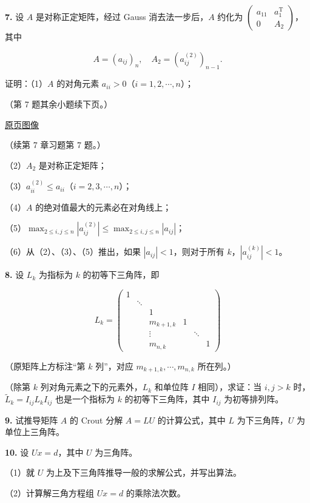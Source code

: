 \documentclass[
  10pt,
  fontset=fandol]{ctexart}
\begin{document}
\textbf{7.} 设 \(A\) 是对称正定矩阵，经过 Gauss 消去法一步后，\(A\) 约化为 \(\begin{pmatrix}a_{11}&a_1^{\mathrm T}\\0&A_2\end{pmatrix}\)，其中

\[
A=(a_{ij})_n,\quad A_2=(a_{ij}^{(2)})_{n-1}.
\]

证明：（1）\(A\) 的对角元素 \(a_{ii}>0\)（\(i=1,2,\cdots,n\)）；

（第 7 题其余小题续下页。）

\href{../../source-images/pdf-213.jpeg}{原页图像}

（续第 7 章习题第 7 题。）

（2）\(A_2\) 是对称正定矩阵；

（3）\(a_{ii}^{(2)}\leqslant a_{ii}\)（\(i=2,3,\cdots,n\)）；

（4）\(A\) 的绝对值最大的元素必在对角线上；

（5）\(\max_{2\leqslant i,\allowbreak j\leqslant n}|a_{ij}^{(2)}|\leqslant\max_{2\leqslant i,\allowbreak j\leqslant n}|a_{ij}|\)；

（6）从（2）、（3）、（5）推出，如果 \(|a_{ij}|<1\)，则对于所有 \(k\)，\(|a_{ij}^{(k)}|<1\)。

\textbf{8.} 设 \(L_k\) 为指标为 \(k\) 的初等下三角阵，即

\[
L_k=\begin{pmatrix}
1&&&&&\\
&\ddots&&&&\\
&&1&&&\\
&&m_{k+1,k}&1&&\\
&&\vdots&&\ddots&\\
&&m_{n,k}&&&1
\end{pmatrix}
\]

（原矩阵上方标注``第 \(k\) 列''，对应 \(m_{k+1,k},\cdots,m_{n,k}\) 所在列。）

（除第 \(k\) 列对角元素之下的元素外，\(L_k\) 和单位阵 \(I\) 相同），求证：当 \(i,j>k\) 时，\(\widetilde L_k=I_{ij}L_kI_{ij}\) 也是一个指标为 \(k\) 的初等下三角阵，其中 \(I_{ij}\) 为初等排列阵。

\textbf{9.} 试推导矩阵 \(A\) 的 Crout 分解 \(A=LU\) 的计算公式，其中 \(L\) 为下三角阵，\(U\) 为单位上三角阵。

\textbf{10.} 设 \(Ux=d\)，其中 \(U\) 为三角阵。

（1）就 \(U\) 为上及下三角阵推导一般的求解公式，并写出算法。

（2）计算解三角方程组 \(Ux=d\) 的乘除法次数。
\end{document}
